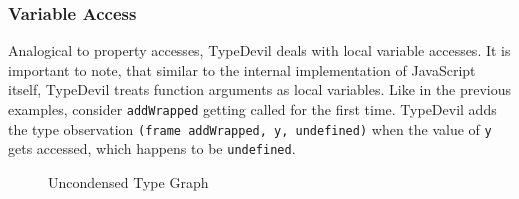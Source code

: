 \documentclass[runningheads,a4paper]{llncs}
\begin{document}
\subsubsection{Variable Access}
Analogical to property accesses, TypeDevil deals with local variable accesses.
It is important to note, that similar to the internal implementation of JavaScript itself, TypeDevil treats function arguments as local variables.
Like in the previous examples, consider \lstinline[columns=fixed]{addWrapped} getting called for the first time.
TypeDevil adds the type observation \lstinline[columns=fixed]{(frame addWrapped, y, undefined)} when the value of \lstinline[columns=fixed]{y} gets accessed, which happens to be \lstinline[columns=fixed]{undefined}.
\begin{figure}[h]
    \caption{Uncondensed Type Graph}
    \label{fig:UncondensedTG}
    \end{figure}
\end{document}
